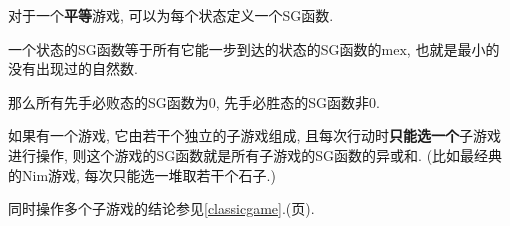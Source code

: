 对于一个\textbf{平等}游戏, 可以为每个状态定义一个SG函数.

一个状态的SG函数等于所有它能一步到达的状态的SG函数的$\text{mex}$, 也就是最小的没有出现过的自然数.

那么所有先手必败态的SG函数为$0$, 先手必胜态的SG函数非$0$.

如果有一个游戏, 它由若干个独立的子游戏组成, 且每次行动时\textbf{只能选一个}子游戏进行操作, 则这个游戏的SG函数就是所有子游戏的SG函数的异或和. (比如最经典的Nim游戏, 每次只能选一堆取若干个石子.)

同时操作多个子游戏的结论参见\ref{classicgame}.(\pageref{classicgame}页).